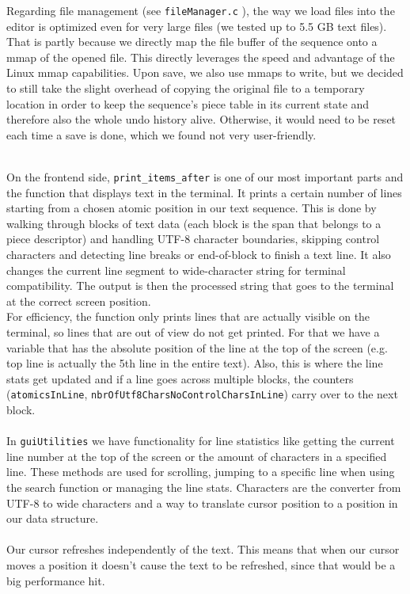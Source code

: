 Regarding file management (see \verb|fileManager.c| \cite{GithubRepo}), the way we load files into the editor is optimized even for very large files (we tested up to 5.5 GB text files). That is partly because we directly map the file buffer of the sequence onto a mmap of the opened file. This directly leverages the speed and advantage of the Linux mmap capabilities. Upon save, we also use mmaps to write, but we decided to still take the slight overhead of copying the original file to a temporary location in order to keep the sequence's piece table in its current state and therefore also the whole undo history alive. Otherwise, it would need to be reset each time a save is done, which we found not very user-friendly. 

\noindent
\\On the frontend side, \verb|print_items_after| is one of our most important parts and the function that displays text in the terminal. It prints a certain number of lines starting from a chosen atomic position in our text sequence.
This is done by walking through blocks of text data (each block is the span that belongs to a piece descriptor) and handling UTF-8 character boundaries, skipping control characters and detecting line breaks or end-of-block to finish a text line.
It also changes the current line segment to wide-character string for terminal compatibility.
The output is then the processed string that goes to the terminal at the correct screen position.
\\For efficiency, the function only prints lines that are actually visible on the terminal, so lines that are out of view do not get printed. For that we have a variable that has the absolute position of the line at the top of the screen (e.g. top line is actually the 5th line in the entire text).
Also, this is where the line stats get updated and if a line goes across multiple blocks, the counters (\verb|atomicsInLine|, \verb|nbrOfUtf8CharsNoControlCharsInLine|) carry over to the next block.
\\
\\In \verb|guiUtilities| we have functionality for line statistics like getting the current line number at the top of the screen or the amount of characters in a specified line. These methods are used for scrolling, jumping to a specific line when using the search function or managing the line stats.
Characters are the converter from UTF-8 to wide characters and a way to translate cursor position to a position in our data structure.
\\
\\Our cursor refreshes independently of the text. This means that when our cursor moves a position it doesn't cause the text to be refreshed, since that would be a big performance hit.